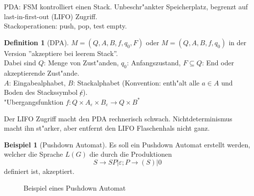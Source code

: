 \documentclass[german, 10pt, a4paper, twocolumn]{scrartcl}
\theoremstyle{definition}
\newtheorem*{definition}{Definition}
\theoremstyle{example}
\newtheorem{example}{Beispiel}[subsection]
\begin{document}
PDA: FSM kontrolliert einen Stack. Unbeschr"ankter Speicherplatz, begrenzt auf last-in-first-out (LIFO) Zugriff.\\
Stackoperationen: push, pop, test empty.

\begin{definition}[DPA]
	$M=(Q, A, B, f, q_0, F)$ oder $M=(Q, A, B, f, q_0)$ in der Version ''akzeptiere bei leerem Stack''.\\
	Dabei sind $Q$: Menge von Zust"anden, $q_0$: Anfangszustand, $F\subseteq Q$: End oder akzeptierende Zust"ande.\\
	$A$: Eingabealphabet, $B$: Stackalphabet (Konvention: enth"alt alle $a\in A$ und Boden des Stackssymbol $\not c$).\\
	"Ubergangsfunktion $f: Q\times A_\varepsilon \times B_\varepsilon \rightarrow Q \times B^*$
\end{definition}

Der LIFO Zugriff macht den PDA rechnerisch schwach. Nichtdeterminismus macht ihn st"arker, aber entfernt den LIFO Flaschenhals nicht ganz.

\begin{example}[Pushdown Automat]
	Es soll ein Pushdown Automat erstellt werden, welcher die Sprache $L(G)$ die durch die Produktionen
	\begin{displaymath}
		S \rightarrow S P | \varepsilon; P \rightarrow (S) | 0
	\end{displaymath}
	definiert ist, akzeptiert.
	\begin{figure}[htb]
		\begin{center}
			\MediumPicture
		\end{center}
		\caption{Beispiel eines Pushdown Automat}
	\end{figure}
\end{example}
\end{document}
